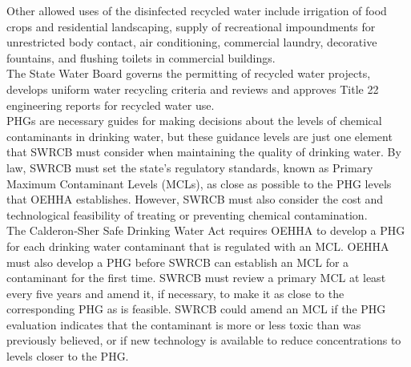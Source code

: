 \documentclass{article}
\begin{document}
Other allowed uses of the disinfected recycled water include irrigation of food crops and residential landscaping, supply of recreational impoundments for unrestricted body contact, air conditioning, commercial laundry, decorative fountains, and flushing toilets in commercial buildings.\\

The State Water Board governs the permitting of recycled water projects, develops uniform water recycling criteria and reviews and approves Title 22 engineering reports for recycled water use.\\



PHGs are necessary guides for making decisions about the levels of chemical contaminants in drinking water, but these guidance levels are just one element that SWRCB must consider when maintaining the quality of drinking water.   By law, SWRCB must set the state’s regulatory standards, known as Primary Maximum Contaminant Levels (MCLs), as close as possible to the PHG levels that OEHHA establishes. However, SWRCB must also consider the cost and technological feasibility of treating or preventing chemical contamination. \\

The Calderon‐Sher Safe Drinking Water Act requires OEHHA to develop a PHG for each drinking water contaminant that is regulated with an MCL. OEHHA must also develop a PHG before SWRCB can establish an MCL for a contaminant for the first time. SWRCB must review a primary MCL at least every five years and amend it, if necessary, to make it as close to the corresponding PHG as is feasible. SWRCB could amend an MCL if the PHG evaluation indicates that the contaminant is more or less toxic than was previously believed, or if new technology is available to reduce concentrations to levels closer to the PHG. \\
\end{document}

